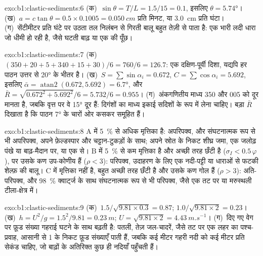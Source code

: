 \begin{solution}{exo:b1:clastic-sediments:6}
(क)~$\sin\theta = T/L = 1.5/15 = 0.1$, इसलिए $\theta = \ang{5.74}$। (ख)~$a =
c\tan\theta = 0.5 \times 0.1005 = \qty{0.050}{cm}$ प्रति मिनट, या
\qty{3.0}{cm} प्रति घंटा। (ग)~सेंटीमीटर प्रति घंटे पर उठता तल निलंबन से गिरती बालू बहुत तेज़ी से पाता है: एक भारी लदी धारा जो धीमी हो रही है, जैसे घटती बाढ़ या एक  की पूँछ।
\end{solution}

\begin{solution}{exo:b1:clastic-sediments:7}
(क)~$(350 + 20 + 5 + 340 + 15 + 30)/6 = 760/6 = 126.7$: एक दक्षिण-पूर्वी
दिशा, यद्यपि हर पाठन उत्तर से \ang{20} के भीतर है। (ख)~$S =
\sum\sin\alpha_i = 0.672$, $C = \sum\cos\alpha_i = 5.692$, इसलिए $\bar\alpha =
\operatorname{atan2}(0.672, 5.692) = \ang{6.7}$, और $\bar R =
\sqrt{0.672^2 + 5.692^2}/6 = 5.732/6 = 0.955$। (ग)~अंकगणितीय माध्य 350 और 005 को दूर मानता है, जबकि वृत्त पर वे \ang{15} दूर हैं: दिगंशों का माध्य इकाई सदिशों के रूप में लेना चाहिए। बड़ा $\bar R$ दिखाता है कि पाठन \ang{7} के चारों ओर कसकर समूहित हैं।
\end{solution}

\begin{solution}{exo:b1:clastic-sediments:8}
A में \qty{5}{\percent} से अधिक मृत्तिका है: अपरिपक्व, और संघटनात्मक रूप से भी अपरिपक्व, अपने फ़ेल्डस्पार और चट्टान-टुकड़ों के साथ; अपने स्रोत के निकट शीघ्र जमा, एक जलोढ़ पंखे या बाढ़-मैदान पर, या एक  से। B में \qty{5}{\percent} से कम मृत्तिका है और अच्छी तरह छँटी है ($\sigma_I < 0.5\,\varphi$), पर उसके कण उप-कोणीय हैं ($\rho < 3$): परिपक्व, उदाहरण के लिए एक नदी-पट्टी या धाराओं से फटकी शेल्फ़ की बालू। C में मृत्तिका नहीं है, बहुत अच्छी तरह छँटी है और उसके कण गोल हैं ($\rho > 3$): अति-परिपक्व, और \qty{98}{\percent} क्वार्ट्ज के साथ संघटनात्मक रूप से भी परिपक्व, जैसे एक तट पर या मरुस्थली टीला-क्षेत्र में।
\end{solution}

\begin{solution}{exo:b1:clastic-sediments:9}
(क)~$1.5/\sqrt{9.81 \times 0.3} = 0.87$; $1.0/\sqrt{9.81 \times 2} = 0.23$।
(ख)~$h = U^2/g = 1.5^2/9.81 = \qty{0.23}{m}$; $U = \sqrt{9.81 \times 2} =
\qty{4.43}{m.s^{-1}}$। (ग)~दिए गए वेग पर फ़ूड संख्या गहराई घटने के साथ बढ़ती है: पतली, तेज़ जल-चादरें, जैसे तट पर एक लहर का पश्च-प्रवाह, आसानी से 1 के निकट फ़ूड संख्याएँ पाती हैं, जबकि कई मीटर गहरी नदी को कई मीटर प्रति सेकंड चाहिए, जो बाढ़ों के अतिरिक्त कुछ ही नदियाँ पहुँचती हैं।
\end{solution}


